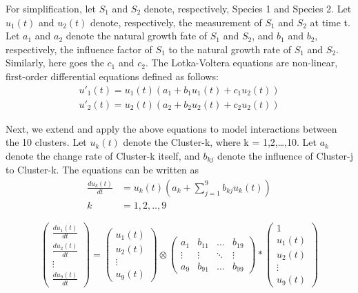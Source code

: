 \documentclass[11pt]{article}
\begin{document}
For simplification, let $S_{1}$ and $S_{2}$ denote, respectively, Species 1 and Species 2. Let $u_{1}(t)$ and $u_{2}(t)$ denote, respectively, the measurement of $S_{1}$ and $S_{2}$ at time t. Let $a_{1}$ and $a_{2}$ denote the natural growth fate of $S_{1}$ and $S_{2}$, and $b_{1}$ and $b_{2}$, respectively, the influence factor of $S_{1}$ to the natural growth rate of $S_{1}$ and $S_{2}$. Similarly, here goes the $c_{1}$ and $c_{2}$. The Lotka-Voltera equations are non-linear, first-order differential equations defined as follows:
\begin{gather}
	u'_{1}(t) = u_{1}(t)(a_{1} + b_{1}u_{1}(t) + c_{1}u_{2}(t)) \label{equ41}\\
	u'_{2}(t) = u_{2}(t)(a_{2} + b_{2}u_{2}(t) + c_{2}u_{2}(t))
\end{gather}

Next, we extend and apply the above equations to model interactions between the 10 clusters. Let $u_{k}(t)$ denote the Cluster-k, where k = 1,2,…,10. Let $a_{k}$ denote the change rate of Cluster-k itself, and $b_{kj}$ denote the influence of Cluster-j to Cluster-k. The equations can be written as
\begin{equation}
	\begin{split}
	\frac{du_{k}(t)}{dt} &= u_{k}(t)(a_{k} + \sum_{j=1}^{9}b_{kj}u_{k}(t)) \\
	k &= 1,2,..,9
	\end{split}
\end{equation}

\begin{equation}
	\begin{pmatrix}
		\frac{du_{1}(t)}{dt} \\
		\frac{du_{2}(t)}{dt} \\
		\vdots \\
		\frac{du_{9}(t)}{dt}	
	\end{pmatrix}
	=
	\begin{pmatrix}
		u_{1}(t) \\
		u_{2}(t) \\
		\vdots \\
		u_{9}(t)
	\end{pmatrix}
	\otimes
	\begin{pmatrix}
		a_{1} & b_{11} & \ldots & b_{19}\\
		\vdots & \vdots & \ddots & \vdots\\
		a_{9} & b_{91} & \ldots & b_{99}
	\end{pmatrix}
	\ast
	\begin{pmatrix}
		1 \\
		u_{1}(t) \\
		u_{2}(t) \\
		\vdots \\
		u_{9}(t)
	\end{pmatrix}
\end{equation}
\end{document}
